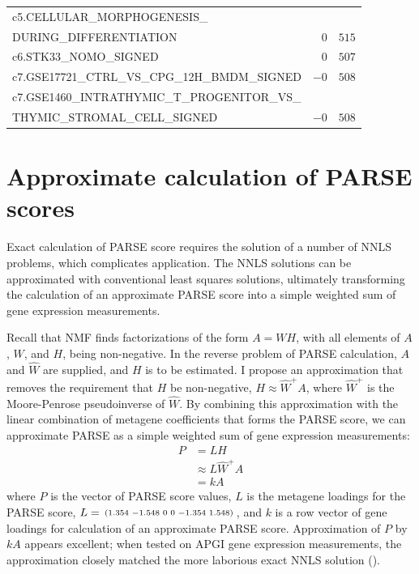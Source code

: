 \begin{longtable}[!htbp]{ l r@{.}l }
\qquad c5.CELLULAR\_MORPHOGENESIS\_                                     \\
\qquad DURING\_DIFFERENTIATION                      & $0$ & $515$       \\
c6.STK33\_NOMO\_SIGNED                              & $0$ & $507$       \\
c7.GSE17721\_CTRL\_VS\_CPG\_12H\_BMDM\_SIGNED       & $-0$ & $508$      \\
c7.GSE1460\_INTRATHYMIC\_T\_PROGENITOR\_VS\_                            \\
\qquad THYMIC\_STROMAL\_CELL\_SIGNED                & $-0$ & $508$      \\ 
\end{longtable}


\chapter{Approximate calculation of \acrshort{PARSE} scores}
\label{app:sigs-parse-approx}
Exact calculation of \gls{PARSE} score requires the solution of a number of \gls{NNLS} problems, which complicates application.  The \gls{NNLS} solutions can be approximated with conventional least squares solutions, ultimately transforming the calculation of an approximate \gls{PARSE} score into a simple weighted sum of gene expression measurements.

Recall that \gls{NMF} finds factorizations of the form $A = W H$, with all elements of $A$, $W$, and $H$, being non-negative.  In the reverse problem of \gls{PARSE} calculation, $A$ and $\widehat{W}$ are supplied, and $H$ is to be estimated.  I propose an approximation that removes the requirement that $H$ be non-negative, $H \approx \widehat{W}^+ A$, where $\widehat{W}^+$ is the Moore-Penrose pseudoinverse of $\widehat{W}$.  By combining this approximation with the linear combination of metagene coefficients that forms the \gls{PARSE} score, we can approximate \gls{PARSE} as a simple weighted sum of gene expression measurements:
\begin{align}
  P &= L H \\
    &\approx L \widehat{W}^+ A \\
    &= k A
\end{align}
where $P$ is the vector of \gls{PARSE} score values, $L$ is the metagene loadings for the \gls{PARSE} score, $L = \begin{smallmatrix}(1.354&-1.548&0&0&-1.354&1.548)\end{smallmatrix}$, and $k$ is a row vector of gene loadings for calculation of an approximate \gls{PARSE} score.  Approximation of $P$ by $k A$ appears excellent; when tested on \gls{APGI} gene expression measurements, the approximation closely matched the more laborious exact \gls{NNLS} solution ().

